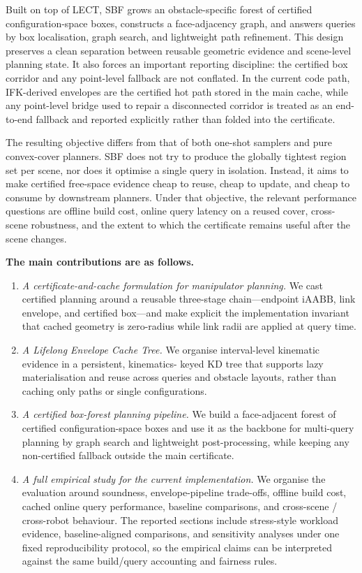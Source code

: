 \documentclass[journal]{IEEEtran}
\newcommand{\iAABB}{\ensuremath{\mathrm{iAABB}}}
\begin{document}
Built on top of LECT, SBF grows an obstacle-specific forest of certified
configuration-space boxes, constructs a face-adjacency graph, and answers
queries by box localisation, graph search, and lightweight path refinement.
This design preserves a clean separation between reusable geometric evidence and
scene-level planning state. It also forces an important reporting discipline:
the certified box corridor and any point-level fallback are not conflated. In
the current code path, IFK-derived envelopes are the certified hot path stored
in the main cache, while any point-level bridge used to repair a disconnected
corridor is treated as an end-to-end fallback and reported explicitly rather
than folded into the certificate.

The resulting objective differs from that of both one-shot samplers and pure
convex-cover planners. SBF does not try to produce the globally tightest region
set per scene, nor does it optimise a single query in isolation. Instead, it
aims to make certified free-space evidence cheap to reuse, cheap to update, and
cheap to consume by downstream planners. Under that objective, the relevant
performance questions are offline build cost, online query latency on a reused
cover, cross-scene robustness, and the extent to which the certificate remains
useful after the scene changes.

\textbf{The main contributions are as follows.}
\begin{enumerate}[nosep]
  \item \emph{A certificate-and-cache formulation for manipulator planning.}
  We cast certified planning around a reusable three-stage chain---endpoint
    \iAABB, link envelope, and certified box---and make explicit the implementation
    invariant that cached geometry is zero-radius while link radii are applied at
    query time.

  \item \emph{A Lifelong Envelope Cache Tree.}
  We organise interval-level kinematic evidence in a persistent, kinematics-
  keyed KD tree that supports lazy materialisation and reuse across queries and
  obstacle layouts, rather than caching only paths or single configurations.

  \item \emph{A certified box-forest planning pipeline.}
  We build a face-adjacent forest of certified configuration-space boxes and use
  it as the backbone for multi-query planning by graph search and lightweight
  post-processing, while keeping any non-certified fallback outside the main
  certificate.

  \item \emph{A full empirical study for the current implementation.}
  We organise the evaluation around soundness, envelope-pipeline trade-offs,
  offline build cost, cached online query performance, baseline comparisons,
  and cross-scene / cross-robot behaviour. The reported sections include
  stress-style workload evidence, baseline-aligned comparisons, and sensitivity
  analyses under one fixed reproducibility protocol, so the empirical claims
  can be interpreted against the same build/query accounting and fairness rules.
\end{enumerate}
\end{document}
